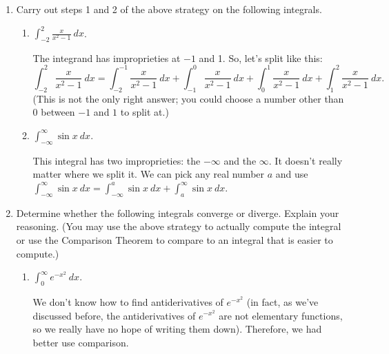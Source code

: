 \documentclass[main]{subfiles}
\begin{document}
\begin{enumerate}

\item 
Carry out steps 1 and 2 of the above strategy on the following
integrals.
\begin{enumerate}
  \item 
  \begin{problem}[\vfill]
  $\displaystyle \int_{-2}^2 \frac{x}{x^2 - 1}~dx$.
  \end{problem}

  \begin{solution}
  The integrand has improprieties at $-1$ and 1.  So, let's split like
  this:
  \[ \int_{-2}^2 \frac{x}{x^2 - 1}~dx = \boxed{\int_{-2}^{-1}
  \frac{x}{x^2 - 1}~dx + \int_{-1}^0 \frac{x}{x^2 - 1}~dx +
  \int_{0}^1 \frac{x}{x^2 - 1}~dx + \int_1^2 \frac{x}{x^2 -
  1}~dx}.\] (This is not the only right answer; you could choose a
  number other than 0 between $-1$ and $1$ to split at.)
  \end{solution}

  \item
  \begin{problem}[\vfill]
  $\displaystyle \int_{-\infty}^\infty \sin x~dx$.
  \end{problem}

  \begin{solution}
  This integral has two improprieties: the $-\infty$ and the $\infty$.
  It doesn't really matter where we split it.  We can pick any real
  number $a$ and use $\displaystyle \int_{-\infty}^\infty \sin x~dx =
  \boxed{\int_{-\infty}^a \sin x~dx + \int_a^\infty \sin x~dx}$.
  \end{solution}

\end{enumerate}

\pspace{\newpage}

\item
Determine whether the following integrals converge or diverge.  Explain
your reasoning.  (You may use the above strategy to actually compute the
integral or use the Comparison Theorem to compare to an integral that is
easier to compute.)
\begin{enumerate}
\item 
\begin{problem}[\vfill]
$\displaystyle \int_0^\infty e^{-x^2}~dx$.
\end{problem}

\begin{solution}
We don't know how to find antiderivatives of $e^{-x^2}$ (in fact, as
we've discussed before, the antiderivatives of $e^{-x^2}$ are not
elementary functions, so we really have no hope of writing them down).
Therefore, we had better use comparison.  


\end{solution}
\end{enumerate}
\end{enumerate}
\end{document}
